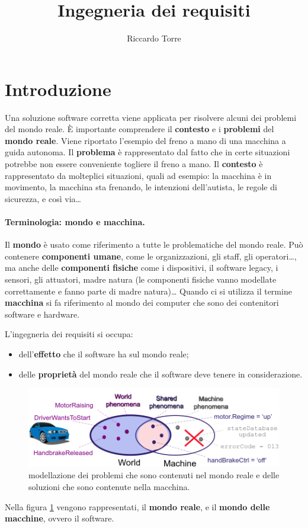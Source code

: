 \documentclass[italian]{article}
\title{Ingegneria dei requisiti}
\author{Riccardo Torre}
\begin{document}
	\maketitle
	\tableofcontents
	\section{Introduzione}
	Una soluzione software corretta viene applicata per risolvere alcuni dei problemi del mondo reale. È importante comprendere il \textbf{contesto} e i \textbf{problemi} del \textbf{mondo reale}.
	Viene riportato l'esempio del freno a mano di una macchina a guida autonoma.
	Il \textbf{problema} è rappresentato dal fatto che in certe situazioni potrebbe non essere conveniente togliere il freno a mano. Il \textbf{contesto} è rappresentato da molteplici situazioni, quali ad esempio: la macchina è in movimento, la macchina sta frenando, le intenzioni dell'autista, le regole di sicurezza, e così via\dots

	\paragraph{Terminologia: mondo e macchina.} Il \textbf{mondo} è usato come riferimento a tutte le problematiche del mondo reale. Può contenere \textbf{componenti umane}, come le organizzazioni, gli staff, gli operatori\dots, ma anche delle \textbf{componenti fisiche} come i dispositivi, il software legacy, i sensori, gli attuatori, madre natura (le componenti fisiche vanno modellate correttamente e fanno parte di madre natura)\dots
	Quando ci si utilizza il termine \textbf{macchina} si fa riferimento al mondo dei computer che sono dei contenitori software e hardware.

	L'ingegneria dei requisiti si occupa:
	\begin{itemize}
		\item dell'\textbf{effetto} che il software ha sul mondo reale;
		\item delle \textbf{proprietà} del mondo reale che il software deve tenere in considerazione.
	\end{itemize}
	\begin{figure}[th]
		\centering
		\includegraphics[width=0.7\linewidth]{img/word-machine-sets}
		\caption{modellazione dei problemi che sono contenuti nel mondo reale e delle soluzioni che sono contenute nella macchina.}
		\label{fig:word-machine-sets}
	\end{figure}
	Nella figura \ref{fig:word-machine-sets} vengono rappresentati, il \textbf{mondo reale}, e il \textbf{mondo delle macchine}, ovvero il software.
\end{document}
